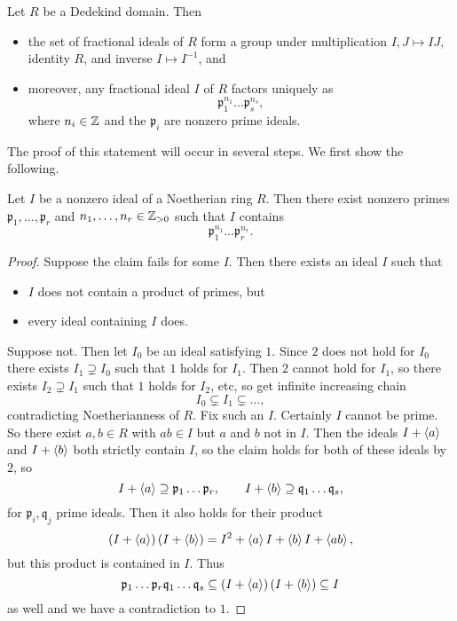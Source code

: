 \begin{theorem}
Let $ R $ be a Dedekind domain. Then
\begin{itemize}
\item the set of fractional ideals of $ R $ form a group under multiplication $ I, J \mapsto IJ $, identity $ R $, and inverse $ I \mapsto I^{-1} $, and
\item moreover, any fractional ideal $ I $ of $ R $ factors uniquely as
$$ \mathfrak{p}_1^{n_1} \dots \mathfrak{p}_s^{n_s}, $$
where $ n_i \in \mathbb{Z} $ and the $ \mathfrak{p}_i $ are nonzero prime ideals.
\end{itemize}
\end{theorem}


The proof of this statement will occur in several steps. We first show the following.

\begin{proposition}
Let $ I $ be a nonzero ideal of a Noetherian ring $ R $. Then there exist nonzero primes $ \mathfrak{p}_1, \dots, \mathfrak{p}_r $ and $ n_1, \dots, n_r \in \mathbb{Z}_{> 0} $ such that $ I $ contains
$$ \mathfrak{p}_1^{n_1} \dots \mathfrak{p}_r^{n_r}. $$
\end{proposition}

\begin{proof}
Suppose the claim fails for some $ I $. Then there exists an ideal $ I $ such that
\begin{itemize}
\item $ I $ does not contain a product of primes, but
\item every ideal containing $ I $ does.
\end{itemize}
Suppose not. Then let $ I_0 $ be an ideal satisfying $ 1 $. Since $ 2 $ does not hold for $ I_0 $ there exists $ I_1 \supsetneq I_0 $ such that $ 1 $ holds for $ I_1 $. Then $ 2 $ cannot hold for $ I_1 $, so there exists $ I_2 \supsetneq I_1 $ such that $ 1 $ holds for $ I_2 $, etc, so get infinite increasing chain
$$ I_0 \subsetneq I_1 \subsetneq \dots, $$
contradicting Noetherianness of $ R $. Fix such an $ I $. Certainly $ I $ cannot be prime. So there exist $ a, b \in R $ with $ ab \in I $ but $ a $ and $ b $ not in $ I $. Then the ideals $ I + \left\langle a \right\rangle $ and $ I + \left\langle b \right\rangle $ both strictly contain $ I $, so the claim holds for both of these ideals by $ 2 $, so
$$ I + \left\langle a \right\rangle \supseteq \mathfrak{p}_1 \dots \mathfrak{p}_r, \qquad I + \left\langle b \right\rangle \supseteq \mathfrak{q}_1 \dots \mathfrak{q}_s, $$
for $ \mathfrak{p}_i, \mathfrak{q}_j $ prime ideals. Then it also holds for their product
$$ \left( I + \left\langle a \right\rangle \right)\left( I + \left\langle b \right\rangle \right) = I^2 + \left\langle a \right\rangle I + \left\langle b \right\rangle I + \left\langle ab \right\rangle, $$
but this product is contained in $ I $. Thus
$$ \mathfrak{p}_1 \dots \mathfrak{p}_r\mathfrak{q}_1 \dots \mathfrak{q}_s \subseteq \left( I + \left\langle a \right\rangle \right)\left( I + \left\langle b \right\rangle \right) \subseteq I $$
as well and we have a contradiction to $ 1 $.
\end{proof}

